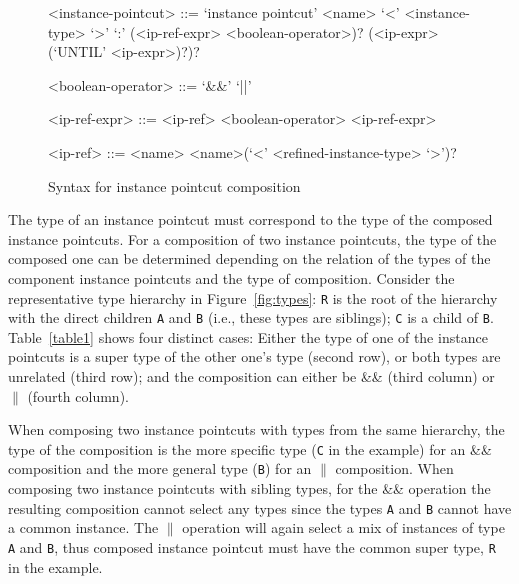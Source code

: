 \documentclass{acm_proc_article-sp}
\begin{document}
\begin{figure}[h]
\begin{grammar}
<instance-pointcut> ::= `instance pointcut' <name> `<' <instance-type> `>' `:'
(<ip-ref-expr> <boolean-operator>)? (<ip-expr> (`UNTIL' <ip-expr>)?)? 

<boolean-operator> ::= `&&' \alt `||'

<ip-ref-expr> ::= <ip-ref>  <boolean-operator> <ip-ref-expr> 

<ip-ref> ::= <name> \alt <name>(`<' <refined-instance-type> `>')?

\end{grammar}
\caption{Syntax for instance pointcut composition}
\label{fig:grammar2}
\end{figure}


The type of an instance pointcut must correspond to the type of the composed instance pointcuts. For a composition of two instance pointcuts, the type of the composed one can be determined depending on the relation of the types of the component instance pointcuts and the type of composition. Consider the representative type hierarchy in Figure~\ref{fig:types}: \texttt{R} is the root of the hierarchy with the direct children \texttt{A} and \texttt{B} (i.e., these types are siblings); \texttt{C} is a child of \texttt{B}. Table~\ref{table1} shows four distinct cases: Either the type of one of the instance pointcuts is a super type of the other one's type (second row), or both types are unrelated (third row); and the composition can either be \&\& (third column) or $\|$ (fourth column).

When composing two instance pointcuts with types from the same hierarchy, the type of the composition is the more specific type (\texttt{C} in the example) for an \&\& composition and the more general type (\texttt{B}) for an $\|$ composition.
When composing two instance pointcuts with sibling types, for the \&\& operation the resulting composition cannot select any types since the types \texttt{A} and \texttt{B} cannot have a common instance. The $\|$ operation will again select a mix of instances of type \texttt{A} and \texttt{B}, thus composed instance pointcut must have the common super type, \texttt{R} in the example.
\end{document}

